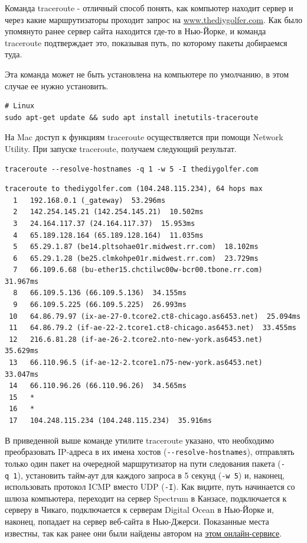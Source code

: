 \documentclass[12pt]{article}
\begin{document}
Команда traceroute - отличный способ понять, как компьютер находит
сервер и через какие маршрутизаторы проходит запрос на
\href{http://www.thediygolfer.com}{www.thediygolfer.com}. Как было
упомянуто ранее сервер сайта находится где-то в Нью-Йорке, и команда
traceroute подтверждает это, показывая путь, по которому пакеты
добираемся туда.

Эта команда может не быть установлена на компьютере по умолчанию, в этом
случае ее нужно установить.

\begin{verbatim}
# Linux
sudo apt-get update && sudo apt install inetutils-traceroute
\end{verbatim}

На Mac доступ к функциям traceroute осуществляется при помощи Network
Utility. При запуске traceroute, получаем следующий результат.

\begin{verbatim}
traceroute --resolve-hostnames -q 1 -w 5 -I thediygolfer.com
\end{verbatim}

\begin{verbatim}
traceroute to thediygolfer.com (104.248.115.234), 64 hops max
  1   192.168.0.1 (_gateway)  53.296ms
  2   142.254.145.21 (142.254.145.21)  10.502ms
  3   24.164.117.37 (24.164.117.37)  15.953ms
  4   65.189.128.164 (65.189.128.164)  11.035ms
  5   65.29.1.87 (be14.pltsohae01r.midwest.rr.com)  18.102ms
  6   65.29.1.28 (be25.clmkohpe01r.midwest.rr.com)  23.729ms
  7   66.109.6.68 (bu-ether15.chctilwc00w-bcr00.tbone.rr.com)  31.967ms
  8   66.109.5.136 (66.109.5.136)  34.155ms
  9   66.109.5.225 (66.109.5.225)  26.993ms
 10   64.86.79.97 (ix-ae-27-0.tcore2.ct8-chicago.as6453.net)  25.094ms
 11   64.86.79.2 (if-ae-22-2.tcore1.ct8-chicago.as6453.net)  33.455ms
 12   216.6.81.28 (if-ae-26-2.tcore2.nto-new-york.as6453.net)  35.629ms
 13   66.110.96.5 (if-ae-12-2.tcore1.n75-new-york.as6453.net)  33.047ms
 14   66.110.96.26 (66.110.96.26)  34.565ms
 15   *
 16   *
 17   104.248.115.234 (104.248.115.234)  35.916ms
\end{verbatim}

В приведенной выше команде утилите traceroute указано, что необходимо
преобразовать IP-адреса в их имена хостов
(\texttt{-\/-resolve-hostnames}), отправлять только один пакет на
очередной маршрутизатор на пути следования пакета (\texttt{-q\ 1}),
установить тайм-аут для каждого запроса в 5 секунд (\texttt{-w\ 5}) и,
наконец, использовать протокол ICMP вместо UDP (\texttt{-I}). Как
видите, путь начинается со шлюза компьютера, переходит на сервер
Spectrum в Канзасе, подключается к серверу в Чикаго, подключается к
серверам Digital Ocean в Нью-Йорке и, наконец, попадает на сервер
веб-сайта в Нью-Джерси. Показанные места известны, так как ранее они
были найдены автором на
\href{https://whatismyipaddress.com/ip-lookup}{этом онлайн-сервисе}.
\end{document}
